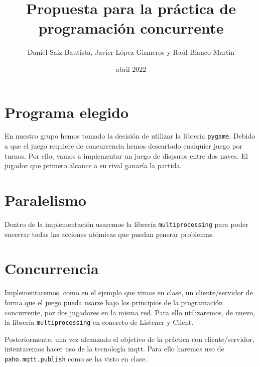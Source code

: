 \documentclass[12pt, a4paper]{article}
\theoremstyle{definition}
\theoremstyle{plain}
\theoremstyle{plain}
\theoremstyle{plain}
\begin{document}
	\title{Propuesta para la práctica de programación concurrente}
	\author{Daniel Saiz Bautista, Javier López Gismeros y Raúl Blanco Martín }
	\date{abril 2022}
	\maketitle
\section*{Programa elegido}
En nuestro grupo hemos tomado la decisión de utilizar la librería \texttt{pygame}. Debido a que el 
juego requiere de concurrencia hemos descartado cualquier juego por turnos. Por ello, vamos 
a implementar un juego de disparos entre dos naves. El jugador que primero alcance a su 
rival ganaría la partida.

\section*{Paralelismo}
Dentro de la implementación usaremos la librería \texttt{multiprocessing} para poder encerrar 
todas las acciones atómicas que puedan generar problemas. 

\section*{Concurrencia}
Implementaremos, como en el ejemplo que vimos en clase, un cliente/servidor de forma 
que el juego pueda usarse bajo los principios de la programación concurrente, por dos jugadores en la misma red. Para ello utilizaremos, de nuevo, la librería \texttt{multiprocessing} en concreto de 
Listener y Client. 

Posteriormente, una vez alcanzado el objetivo de la práctica con cliente/servidor, intentaremos hacer uso de la tecnología mqtt. Para ello haremos uso de \texttt{paho.mqtt.publish} como se ha visto en clase. 
\end{document}
